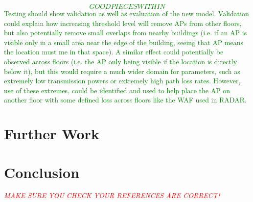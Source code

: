 \documentclass{UoYCSproject}
\begin{document}
		\textcolor{green}{\emph{\[GOOD PIECES WITHIN\]}Testing should show validation as well as evaluation of the new model. Validation could explain how increasing threshold level will remove APs from other floors, but also potentially remove small overlaps from nearby buildings (i.e. if an AP is visible only in a small area near the edge of the building, seeing that AP means the location must me in that space). A similar effect could potentially be observed across floors (i.e. the AP only being visible if the location is directly below it), but this would require a much wider domain for parameters, such as extremely low transmission powers or extremely high path loss rates. However, use of these extremes, could be identified and used to help place the AP on another floor with some defined loss across floors like the WAF used in RADAR.}
	
	\chapter{Further Work}
    \label{chap:further}
	
	\chapter{Conclusion}
    \label{chap:conclusion}
    
    \textcolor{red}{\emph{MAKE SURE YOU CHECK YOUR REFERENCES ARE CORRECT!}}
        
    
	
\end{document}
